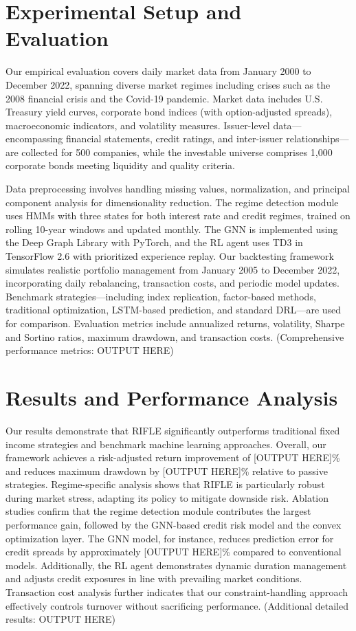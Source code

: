 \documentclass[
  a4paper,
  10pt,
  unnumberedsections,
  twoside,
]{LTJournalArticle}
\begin{document}
\section{Experimental Setup and Evaluation}
Our empirical evaluation covers daily market data from January 2000 to December 2022, spanning diverse market regimes including crises such as the 2008 financial crisis and the Covid-19 pandemic. Market data includes U.S. Treasury yield curves, corporate bond indices (with option-adjusted spreads), macroeconomic indicators, and volatility measures. Issuer-level data—encompassing financial statements, credit ratings, and inter-issuer relationships—are collected for 500 companies, while the investable universe comprises 1,000 corporate bonds meeting liquidity and quality criteria.

Data preprocessing involves handling missing values, normalization, and principal component analysis for dimensionality reduction. The regime detection module uses HMMs with three states for both interest rate and credit regimes, trained on rolling 10-year windows and updated monthly. The GNN is implemented using the Deep Graph Library with PyTorch, and the RL agent uses TD3 in TensorFlow 2.6 with prioritized experience replay. Our backtesting framework simulates realistic portfolio management from January 2005 to December 2022, incorporating daily rebalancing, transaction costs, and periodic model updates. Benchmark strategies—including index replication, factor-based methods, traditional optimization, LSTM-based prediction, and standard DRL—are used for comparison. Evaluation metrics include annualized returns, volatility, Sharpe and Sortino ratios, maximum drawdown, and transaction costs. (Comprehensive performance metrics: OUTPUT HERE)

\section{Results and Performance Analysis}
Our results demonstrate that RIFLE significantly outperforms traditional fixed income strategies and benchmark machine learning approaches. Overall, our framework achieves a risk-adjusted return improvement of [OUTPUT HERE]\% and reduces maximum drawdown by [OUTPUT HERE]\% relative to passive strategies. Regime-specific analysis shows that RIFLE is particularly robust during market stress, adapting its policy to mitigate downside risk. Ablation studies confirm that the regime detection module contributes the largest performance gain, followed by the GNN-based credit risk model and the convex optimization layer. The GNN model, for instance, reduces prediction error for credit spreads by approximately [OUTPUT HERE]\% compared to conventional models. Additionally, the RL agent demonstrates dynamic duration management and adjusts credit exposures in line with prevailing market conditions. Transaction cost analysis further indicates that our constraint-handling approach effectively controls turnover without sacrificing performance. (Additional detailed results: OUTPUT HERE)
\end{document}
